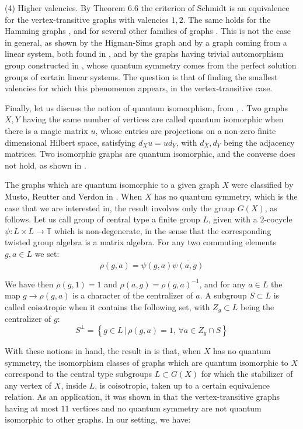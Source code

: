 \documentclass[11pt]{amsart}
\begin{document}
\medskip

(4) Higher valencies. By Theorem 6.6 the criterion of Schmidt is an equivalence for the vertex-transitive graphs with valencies $1,2$. The same holds for the Hamming graphs \cite{sc2}, and for several other families of graphs \cite{meu}. This is not the case in general, as shown by the Higman-Sims graph and by a graph coming from a linear system, both found in \cite{sc2}, and by the graphs having trivial automorphism group constructed in \cite{drs}, whose quantum symmetry comes from the perfect solution groups of certain linear systems. The question is that of finding the smallest valencies for which this phenomenon appears, in the vertex-transitive case.

\medskip

Finally, let us discuss the notion of quantum isomorphism, from \cite{amr}, \cite{lmr}. Two graphs $X,Y$ having the same number of vertices are called quantum isomorphic when there is a magic matrix $u$, whose entries are projections on a non-zero finite dimensional Hilbert space, satisfying $d_Xu=ud_Y$, with $d_X,d_Y$ being the adjacency matrices. Two isomorphic graphs are quantum isomorphic, and the converse does not hold, as shown in \cite{amr}.

The graphs which are quantum isomorphic to a given graph $X$ were classified by Musto, Reutter and Verdon in \cite{mrv}. When $X$ has no quantum symmetry, which is the case that we are interested in, the result involves only the group $G(X)$, as follows. Let us call group of central type a finite group $L$, given with a $2$-cocycle $\psi:L\times L\to\mathbb T$ which is non-degenerate, in the sense that the corresponding twisted group algebra is a matrix algebra. For any two commuting elements $g,a\in L$ we set:
$$\rho(g,a)=\psi(g,a)\overline{\psi(a,g)}$$

We have then $\rho(g,1)=1$ and $\rho(a,g)=\rho(g,a)^{-1}$, and for any $a\in L$ the map $g\to\rho(g,a)$ is a character of the centralizer of $a$. A subgroup $S\subset L$ is called coisotropic when it contains the following set, with $Z_g\subset L$ being the centralizer of $g$:
$$S^\perp=\left\{g\in L\,\Big|\,\rho(g,a)=1,\,\forall a\in Z_g\cap S\right\}$$

With these notions in hand, the result in \cite{mrv} is that, when $X$ has no quantum symmetry, the isomorphism classes of graphs which are quantum isomorphic to $X$ correspond to the central type subgroups $L\subset G(X)$ for which the stabilizer of any vertex of $X$, inside $L$, is coisotropic, taken up to a certain equivalence relation. As an application, it was shown in \cite{mrv} that the vertex-transitive graphs having at most $11$ vertices and no quantum symmetry are not quantum isomorphic to other graphs. In our setting, we have:
\end{document}
